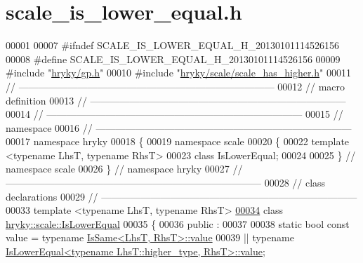\hypertarget{scale__is__lower__equal_8h_source}{\section{scale\-\_\-is\-\_\-lower\-\_\-equal.\-h}
}

\begin{DoxyCode}
00001 
00007 \textcolor{preprocessor}{#ifndef SCALE\_IS\_LOWER\_EQUAL\_H\_20130101114526156}
00008 \textcolor{preprocessor}{}\textcolor{preprocessor}{#define SCALE\_IS\_LOWER\_EQUAL\_H\_20130101114526156}
00009 \textcolor{preprocessor}{}\textcolor{preprocessor}{#include "\hyperlink{gp_8h}{hryky/gp.h}"}
00010 \textcolor{preprocessor}{#include "\hyperlink{scale__has__higher_8h}{hryky/scale/scale_has_higher.h}"}
00011 \textcolor{comment}{//
      ------------------------------------------------------------------------------}
00012 \textcolor{comment}{// macro definition}
00013 \textcolor{comment}{//
      ------------------------------------------------------------------------------}
00014 \textcolor{comment}{//
      ------------------------------------------------------------------------------}
00015 \textcolor{comment}{// namespace}
00016 \textcolor{comment}{//
      ------------------------------------------------------------------------------}
00017 \textcolor{keyword}{namespace }hryky
00018 \{
00019 \textcolor{keyword}{namespace }scale
00020 \{
00022     \textcolor{keyword}{template} <\textcolor{keyword}{typename} LhsT, \textcolor{keyword}{typename} RhsT>
00023     \textcolor{keyword}{class }IsLowerEqual;
00024 
00025 \} \textcolor{comment}{// namespace scale}
00026 \} \textcolor{comment}{// namespace hryky}
00027 \textcolor{comment}{//
      ------------------------------------------------------------------------------}
00028 \textcolor{comment}{// class declarations}
00029 \textcolor{comment}{//
      ------------------------------------------------------------------------------}
00033 \textcolor{comment}{}\textcolor{keyword}{template} <\textcolor{keyword}{typename} LhsT, \textcolor{keyword}{typename} RhsT>
\hypertarget{scale__is__lower__equal_8h_source_l00034}{}\hyperlink{classhryky_1_1scale_1_1_is_lower_equal}{00034} \textcolor{keyword}{class }\hyperlink{classhryky_1_1scale_1_1_is_lower_equal}{hryky::scale::IsLowerEqual}
00035 \{
00036 \textcolor{keyword}{public} :
00037 
00038     \textcolor{keyword}{static} \textcolor{keywordtype}{bool} \textcolor{keyword}{const} value = \textcolor{keyword}{typename} \hyperlink{classhryky_1_1_is_same}{IsSame<LhsT, RhsT>::value}
00039         || \textcolor{keyword}{typename} \hyperlink{classhryky_1_1scale_1_1_is_lower_equal}{IsLowerEqual<typename LhsT::higher_type, RhsT>::value};

\end{DoxyCode}
